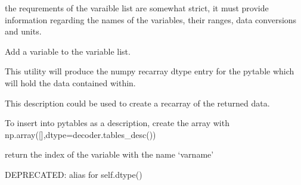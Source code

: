 \documentclass[letterpaper,10pt,english]{sphinxmanual}
\begin{document}
\begin{fulllineitems}
\label{classes:pyodec.core.VariableList}
the requrements of the varaible list are somewhat strict, it must provide information
regarding the names of the variables, their ranges, data conversions and units.

\begin{fulllineitems}
\label{classes:pyodec.core.VariableList.addvar}
Add a variable to the variable list.

\end{fulllineitems}


\begin{fulllineitems}
\label{classes:pyodec.core.VariableList.dtype}
This utility will produce the numpy recarray dtype entry
for the pytable which will hold the data contained within.

This description could be used to create a recarray of the returned data.

To insert into pytables as a description, create the array with
np.array({[}{]},dtype=decoder.tables\_desc())

\end{fulllineitems}


\begin{fulllineitems}
\label{classes:pyodec.core.VariableList.get_index}
return the index of the variable with the name `varname'

\end{fulllineitems}


\begin{fulllineitems}
\label{classes:pyodec.core.VariableList.tables_desc}
DEPRECATED: alias for self.dtype()

\end{fulllineitems}


\end{fulllineitems}
\end{document}
